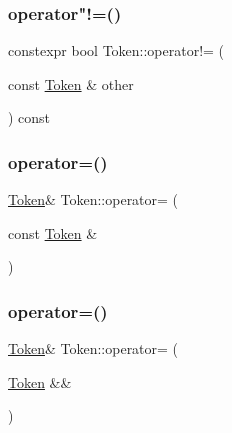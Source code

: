 \subsubsection{\texorpdfstring{operator"!=()}{operator!=()}}
{\footnotesize\ttfamily constexpr bool Token\+::operator!= (\begin{DoxyParamCaption}\item[{const \hyperlink{class_token}{Token} \&}]{other }\end{DoxyParamCaption}) const\hspace{0.3cm}{\ttfamily [inline]}}

\mbox{\label{class_token_a302f8febd87a9cca349ba76dfd782548}} 
\subsubsection{\texorpdfstring{operator=()}{operator=()}\hspace{0.1cm}{\footnotesize\ttfamily [1/4]}}
{\footnotesize\ttfamily \hyperlink{class_token}{Token}\& Token\+::operator= (\begin{DoxyParamCaption}\item[{const \hyperlink{class_token}{Token} \&}]{ }\end{DoxyParamCaption})\hspace{0.3cm}{\ttfamily [default]}}

\mbox{\label{class_token_a4f45441b8d2dfe881c448377d4ca2cd4}} 
\subsubsection{\texorpdfstring{operator=()}{operator=()}\hspace{0.1cm}{\footnotesize\ttfamily [2/4]}}
{\footnotesize\ttfamily \hyperlink{class_token}{Token}\& Token\+::operator= (\begin{DoxyParamCaption}\item[{\hyperlink{class_token}{Token} \&\&}]{ }\end{DoxyParamCaption})\hspace{0.3cm}{\ttfamily [default]}}

\mbox{\label{class_token_af5948f6aab6e746efaae099c750f348f}} 
